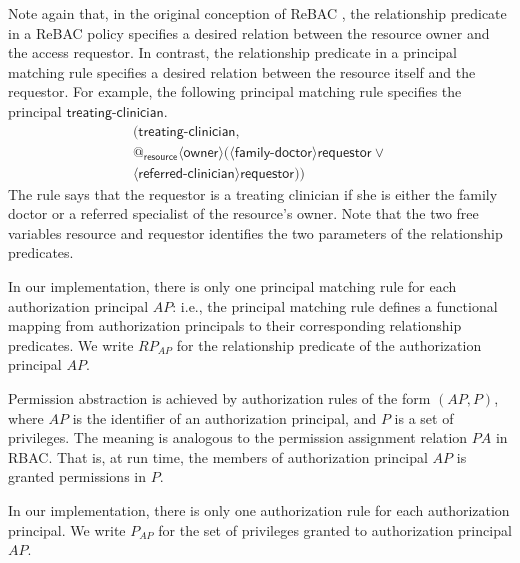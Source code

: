 \documentclass{acm_proc_article-sp}
\begin{document}
Note again that, in the original conception of ReBAC
\cite{Bruns-etal:2012}, the relationship predicate in a ReBAC policy
specifies a desired relation between the resource owner and the access
requestor.  In contrast, the relationship predicate in a principal
matching rule specifies a desired relation between the resource itself
and the requestor.  For example, the following principal matching
rule specifies the principal $\mathsf{treating}\text{-}\mathsf{clinician}$.
\begin{multline*}
   \Big( \mathsf{treating}\text{-}\mathsf{clinician},\\
     @_{\mathsf{resource}} \langle
        \mathsf{owner}
     \rangle \big(
       \langle 
          \mathsf{family}\text{-}\mathsf{doctor}
       \rangle \mathsf{requestor}
       \lor \mbox{}\\
       \langle 
          \mathsf{referred}\text{-}\mathsf{clinician}
       \rangle \mathsf{requestor}
     \big)
   \Big)
\end{multline*}
The rule says that the requestor is a treating clinician if she is
either the family doctor or a referred specialist of the resource's
owner.  Note that the two free variables \textsf{resource} and
\textsf{requestor} identifies the two parameters of the relationship
predicates.

In our implementation, there is only one principal matching rule for
each authorization principal $\mathit{AP}$: i.e., the principal
matching rule defines a functional mapping from authorization
principals to their corresponding relationship predicates.  We write
$\mathit{RP}_{\mathit{AP}}$ for the relationship predicate of the
authorization principal $\mathit{AP}$.

Permission abstraction is achieved by authorization rules of the form
$(\mathit{AP}, P)$, where $\mathit{AP}$ is the identifier of an
authorization principal, and $P$ is a set of privileges.  The meaning
is analogous to the permission assignment relation $\mathit{PA}$ in
RBAC.  That is, at run time, the members of authorization principal
$\mathit{AP}$ is granted permissions in $P$.

In our implementation, there is only one authorization rule
for each authorization principal.  We write $P_{\mathit{AP}}$
for the set of privileges granted to authorization principal
$\mathit{AP}$.
\end{document}
